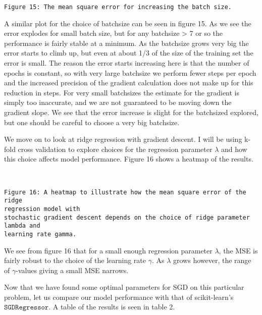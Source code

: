 \documentclass[11pt]{article}
\begin{document}
    \begin{Verbatim}[commandchars=\\\{\}]
Figure 15: The mean square error for increasing the batch size.
    \end{Verbatim}

    A similar plot for the choice of batchsize can be seen in figure 15. As
we see the error explodes for small batch size, but for any batchsize
\textgreater{} 7 or so the performance is fairly stable at a minimum. As
the batchsize grows very big the error starts to climb up, but even at
about 1/3 of the size of the training set the error is small. The reason
the error starts increasing here is that the number of epochs is
constant, so with very large batchsize we perform fewer steps per epoch
and the increased precision of the gradient calculation does not make up
for this reduction in steps. For very small batchsizes the estimate for
the gradient is simply too inaccurate, and we are not guaranteed to be
moving down the gradient slope. We see that the error increase is slight
for the batchsized explored, but one should be careful to choose a very
big batchsize.

    We move on to look at ridge regression with gradient descent. I will be
using k-fold cross validation to explore choices for the regression
parameter \(\lambda\) and how this choice affects model performance.
Figure 16 shows a heatmap of the results.

        
    \begin{center}
    \end{center}
    { \hspace*{\fill} \\}
    
    \begin{Verbatim}[commandchars=\\\{\}]
Figure 16: A heatmap to illustrate how the mean square error of the ridge
regression model with
stochastic gradient descent depends on the choice of ridge parameter lambda and
learning rate gamma.
    \end{Verbatim}

    We see from figure 16 that for a small enough regression parameter
\(\lambda\), the MSE is fairly robust to the choice of the learning rate
\(\gamma\). As \(\lambda\) grows however, the range of \(\gamma\)-values
giving a small MSE narrows.

    Now that we have found some optimal parameters for SGD on this
particular problem, let us compare our model performance with that of
scikit-learn's \(\texttt{SGDRegressor}\). A table of the results is seen
in table 2.
\end{document}
